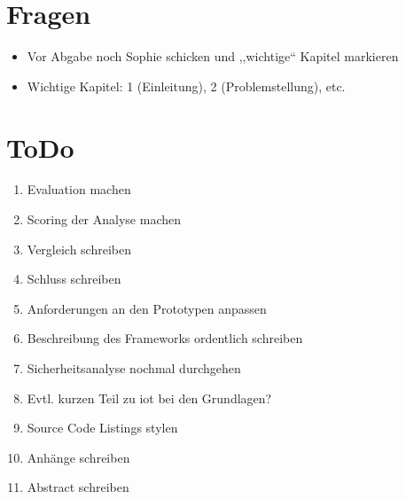 \section*{Fragen}
    \begin{itemize}
        \item Vor Abgabe noch Sophie schicken und ,,wichtige`` Kapitel markieren
        \item Wichtige Kapitel: 1 (Einleitung), 2 (Problemstellung), etc.
    \end{itemize}
    
\section*{ToDo}
    \begin{enumerate}[noitemsep]
        \item Evaluation machen
        \item Scoring der Analyse machen
        \item Vergleich schreiben
        \item Schluss schreiben
        \item Anforderungen an den Prototypen anpassen
        \item Beschreibung des Frameworks ordentlich schreiben
        \item Sicherheitsanalyse nochmal durchgehen
        \item Evtl. kurzen Teil zu \gls{iot} bei den Grundlagen?
        \item Source Code Listings stylen
        \item Anhänge schreiben
        \item Abstract schreiben
    \end{enumerate}
    
